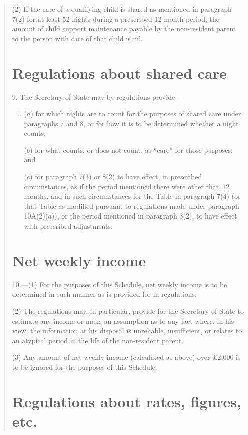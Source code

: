 \documentclass[12pt,a4paper]{article}
\begin{document}
\begin{quotation}
(2) If the care of a qualifying child is shared as mentioned in paragraph 7(2)  for at least 52 nights during a prescribed 12-month period, the amount of child support maintenance payable by the non-resident parent to the person with care of that child is nil.

\section*{Regulations about shared care}

9. The Secretary of State may by regulations provide—
\begin{enumerate}\item[]
($a$) for which nights are to count for the purposes of shared care under paragraphs 7 and 8, or for how it is to be determined whether a night counts;

($b$) for what counts, or does not count, as “care” for those purposes; and

($c$) for paragraph 7(3)  or 8(2)  to have effect, in prescribed circumstances, as if the period mentioned there were other than 12 months, and in such circumstances for the Table in paragraph 7(4)  (or that Table as modified pursuant to regulations made under paragraph 10A(2)($a$)), or the period mentioned in paragraph 8(2), to have effect with prescribed adjustments.
\end{enumerate}

\section*{Net weekly income}

10.---(1) For the purposes of this Schedule, net weekly income is to be determined in such manner as is provided for in regulations.

(2) The regulations may, in particular, provide for the Secretary of State to estimate any income or make an assumption as to any fact where, in his view, the information at his disposal is unreliable, insufficient, or relates to an atypical period in the life of the non-resident parent.

(3) Any amount of net weekly income (calculated as above) over £2,000 is to be ignored for the purposes of this Schedule.

\section*{Regulations about rates, figures, etc.}


\end{quotation}
\end{document}

